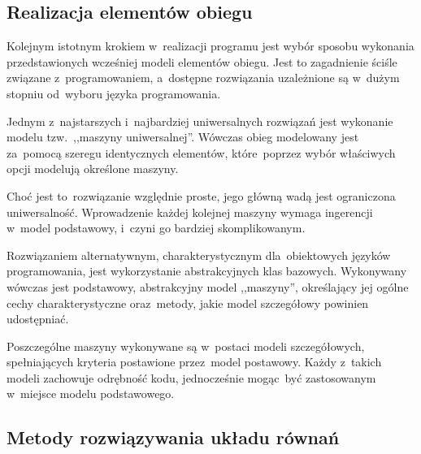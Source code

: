\subsection{Realizacja elementów obiegu}

Kolejnym istotnym krokiem w~realizacji programu jest wybór sposobu
wykonania przedstawionych wcześniej modeli elementów obiegu. Jest to
zagadnienie ściśle związane z~programowaniem, a~dostępne rozwiązania
uzależnione są w~dużym stopniu od~wyboru języka programowania.

Jednym z~najstarszych i~najbardziej uniwersalnych rozwiązań jest
wykonanie modelu tzw.~,,maszyny uniwersalnej''. Wówczas obieg modelowany
jest za~pomocą szeregu identycznych elementów, które~poprzez wybór
właściwych opcji modelują określone maszyny.

Choć jest to~rozwiązanie względnie proste, jego główną wadą jest
ograniczona uniwersalność. Wprowadzenie każdej kolejnej maszyny wymaga
ingerencji w~model podstawowy, i~czyni go bardziej skomplikowanym.

Rozwiązaniem alternatywnym, charakterystycznym dla~obiektowych języków
programowania, jest wykorzystanie abstrakcyjnych klas bazowych.
Wykonywany wówczas jest podstawowy, abstrakcyjny model ,,maszyny'',
określający jej ogólne cechy charakterystyczne oraz~metody, jakie
model szczegółowy powinien udostępniać.

Poszczególne maszyny wykonywane są w~postaci modeli szczegółowych,
spełniających kryteria postawione przez~model postawowy. Każdy z~takich
modeli zachowuje odrębność kodu, jednocześnie mogąc~być zastosowanym
w~miejsce modelu podstawowego.


\subsection{Metody rozwiązywania układu równań}

\label{rozw-ukl-rown}
